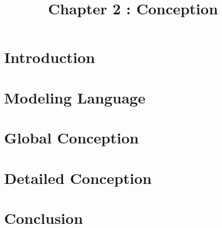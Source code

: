 \documentclass[12pt]{article}
\begin{document}
	\listoffigures
	\title{Chapter 2 : Conception}
	\maketitle
	
	\section{Introduction}
	\section{Modeling Language}
	\section{Global Conception}
	\section{Detailed Conception}
	\section{Conclusion}
	
\end{document}

